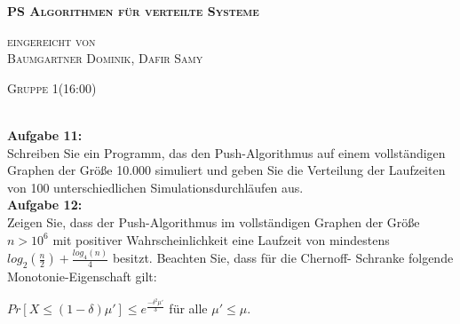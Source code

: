\documentclass[12pt,a4paper]{report}
\begin{document}
\begin{titlepage}
	\begin{center}
		
		\vspace*{1.0cm}
		\huge
		\textsc{\bf{PS Algorithmen für verteilte Systeme}}
		
		\vspace*{4.0cm}
		\textsc{
			\normalsize{eingereicht von} \\[0.5\baselineskip]
			{\large Baumgartner Dominik, Dafir Samy}
		}
		
		\vspace*{3.0cm}
		\textsc{
			\normalsize{Gruppe  1(16:00)}
		}
		
	\end{center}
	
\end{titlepage}
\ \\
\textbf{Aufgabe 11:}\\
Schreiben Sie ein Programm, das den Push-Algorithmus auf einem vollständigen Graphen der Größe 10.000 simuliert und geben Sie die
Verteilung der Laufzeiten von 100 unterschiedlichen Simulationsdurchläufen aus.
\newpage
\ \\
\textbf{Aufgabe 12:}\\
Zeigen Sie, dass der Push-Algorithmus im vollständigen Graphen der Größe $n>10^6$ mit positiver Wahrscheinlichkeit eine Laufzeit von mindestens $log_2(\frac{n}{2})+\frac{log_4(n)}{4}$ besitzt. Beachten Sie, dass für die Chernoff-
Schranke folgende Monotonie-Eigenschaft gilt:
\begin{center}
$Pr[X \le (1 - \delta)\mu'] \le e^{\frac{-\delta^2\mu'}{3}}$ für alle $\mu'\le \mu$.
\end{center}
\ \\
\end{document}
